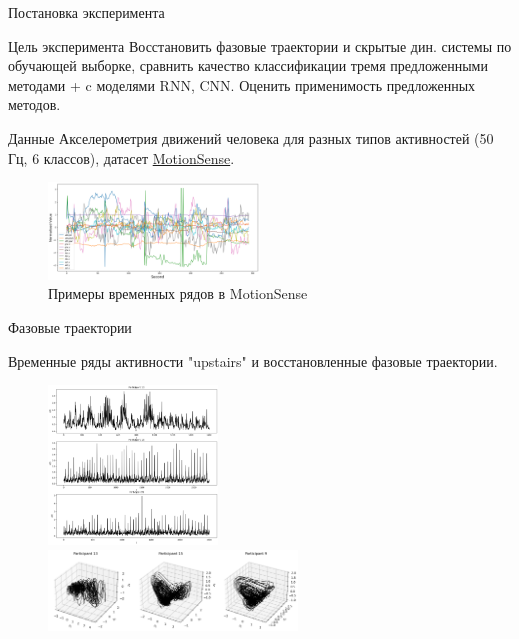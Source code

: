 \documentclass[10pt]{beamer}
\theoremstyle{definition}
\begin{document}
	\begin{frame}{Постановка эксперимента}
		
		\begin{block}{Цель эксперимента}
			Восстановить фазовые траектории и скрытые дин. системы по обучающей выборке, сравнить качество классификации тремя предложенными методами + c моделями RNN, CNN. Оценить применимость предложенных методов.
		\end{block}
		
		\begin{exampleblock}{Данные}
			Акселерометрия движений человека для разных типов активностей (50 Гц, 6 классов), датасет \href{https://github.com/mmalekzadeh/motion-sense}{MotionSense}.
		\end{exampleblock}
		
		\begin{figure}[h]
			\centering
			\includegraphics[width=0.5\textwidth]{img/motionsense}
			\caption{Примеры временных рядов в MotionSense}
		\end{figure}
		
	\end{frame}	
	
	\begin{frame}{Фазовые траектории}
		
		Временные ряды активности "upstairs" и восстановленные фазовые траектории.
		
		\begin{figure}
			\centering
			\includegraphics[width=0.4\textwidth]{img/series_ups.png}
			\includegraphics[width=0.59\textwidth]{img/phase_ups.png}
		\end{figure}
		
	\end{frame}	
	
\end{document}
